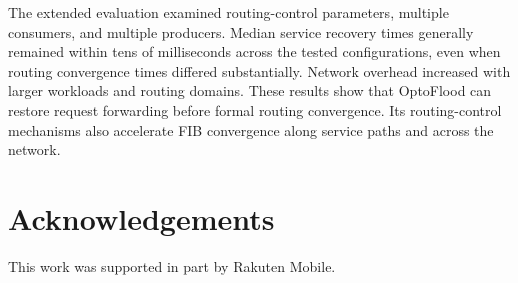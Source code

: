 \documentclass[10pt,conference]{IEEEtran}
\begin{document}
The extended evaluation examined routing-control parameters, multiple consumers, and multiple producers. Median service recovery times generally remained within tens of milliseconds across the tested configurations, even when routing convergence times differed substantially. Network overhead increased with larger workloads and routing domains. These results show that OptoFlood can restore request forwarding before formal routing convergence. Its routing-control mechanisms also accelerate FIB convergence along service paths and across the network.


\section*{Acknowledgements}

This work was supported in part by Rakuten Mobile.




\end{document}
